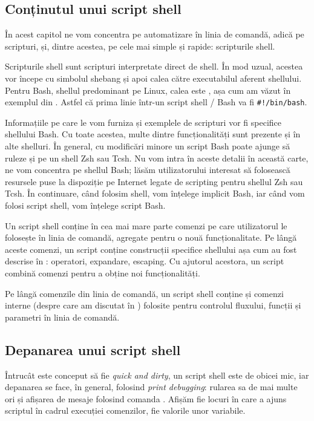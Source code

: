 \subsection{Conținutul unui script shell}
\label{sec:auto:dev:content}

În acest capitol ne vom concentra pe automatizare în
linia de comandă, adică pe scripturi, și, dintre acestea, pe cele mai simple și
rapide: scripturile shell.

Scripturile shell sunt scripturi interpretate direct de shell.
În mod uzual, acestea vor începe cu simbolul shebang și apoi calea către executabilul aferent shellului.
Pentru Bash, shellul predominant pe Linux, calea este , așa cum am văzut în exemplul din .
Astfel că prima linie într-un script shell / Bash va fi \texttt{\#!/bin/bash}.

Informațiile pe care le vom furniza și exemplele de scripturi vor fi specifice shellului Bash.
Cu toate acestea, multe dintre funcționalități sunt prezente și în alte shelluri.
În general, cu modificări minore un script Bash poate ajunge să ruleze și pe un shell Zsh sau Tcsh.
Nu vom intra în aceste detalii în această carte, ne vom concentra pe shellul Bash; lăsăm utilizatorului interesat să folosească resursele puse la dispoziție pe Internet legate de scripting pentru shellul Zsh sau Tcsh.
În continuare, când folosim shell, vom înțelege implicit Bash, iar când vom folosi script shell, vom înțelege script Bash.

Un script shell conține în cea mai mare parte comenzi pe care utilizatorul le folosește în linia de comandă, agregate pentru o nouă funcționalitate.
Pe lângă aceste comenzi, un script conține construcții specifice shellului așa cum au fost descrise în : operatori, expandare, escaping.
Cu ajutorul acestora, un script combină comenzi pentru a obține noi funcționalități.

Pe lângă comenzile din linia de comandă, un script shell conține și comenzi interne (despre care am discutat în ) folosite pentru controlul fluxului, funcții și parametri în linia de comandă.

\subsection{Depanarea unui script shell}
\label{sec:auto:dev:debug}

Întrucât este conceput să fie \textit{quick and dirty}, un script shell este de obicei mic, iar depanarea se face, în general, folosind \textit{print debugging}: rularea sa de mai multe ori și afișarea de mesaje folosind comanda .
Afișăm fie locuri în care a ajuns scriptul în cadrul execuției comenzilor, fie valorile unor variabile.

